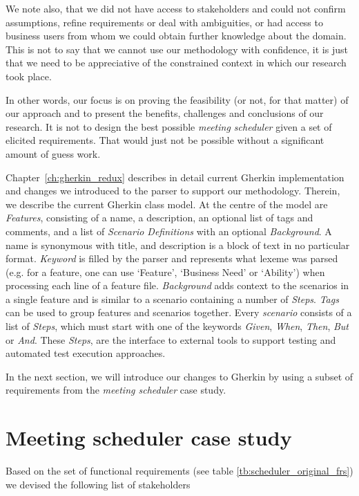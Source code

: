 \documentclass[dissertation,final]{softeng}
\begin{document}
We note also, that we did not have access to stakeholders and could not confirm assumptions, refine requirements or deal with ambiguities, or had access to business users from whom we could obtain further knowledge about the domain. This is not to say that we cannot use our methodology with confidence, it is just that we need to be appreciative of the constrained context in which our research took place.

In other words, our focus is on proving the feasibility (or not, for that matter) of our approach and to present the benefits, challenges and conclusions of our research. It is not to design the best possible \emph{meeting scheduler} given a set of elicited requirements. That would just not be possible without a significant amount of guess work. 

Chapter~\ref{ch:gherkin_redux} describes in detail current Gherkin implementation and changes we introduced to the parser to support our methodology. Therein, we describe the current Gherkin class model. At the centre of the model are \emph{Features}, consisting of a name, a description, an optional list of tags and comments, and a list of \emph{Scenario Definitions} with an optional \emph{Background}. A name is synonymous with title, and description is a block of text in no particular format. \emph{Keyword} is filled by the parser and represents what lexeme was parsed (e.g. for a feature, one can use `Feature', `Business Need' or `Ability') when processing each line of a feature file. \emph{Background} adds context to the scenarios in a single feature and is similar to a scenario containing a number of \emph{Steps}. \emph{Tags} can be used to group features and scenarios together. Every \emph{scenario} consists of a list of \emph{Steps}, which must start with one of the keywords \emph{Given}, \emph{When}, \emph{Then}, \emph{But} or \emph{And}. These \emph{Steps}, are the interface to external tools to support testing and automated test execution approaches.

In the next section, we will introduce our changes to Gherkin by using a subset of requirements from the \emph{meeting scheduler} case study.

\section{Meeting scheduler case study}
\label{sec:case_study}
Based on the set of functional requirements (see table \ref{tb:scheduler_original_frs}) we devised the following list of stakeholders
\end{document}
